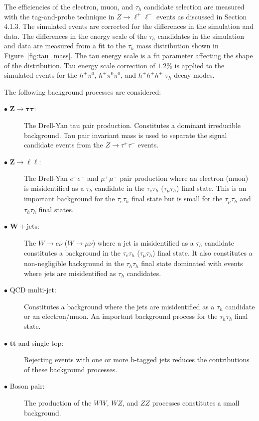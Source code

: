 The efficiencies of the electron, muon, and $\tau_h$ candidate selection are measured with the tag-and-probe technique in $Z\rightarrow \ell^{+}\ell^{-}$ events as discussed in Section 4.1.3. The simulated events are corrected for the differences in the simulation and data. The differences in the energy scale of the $\tau_h$ candidates in the simulation and data are measured from a fit to the $\tau_h$ mass distribution shown in Figure~\ref{fig:tau_mass}. The tau energy scale is a fit parameter affecting the shape of the distribution. Tau energy scale correction of $1.2\%$ is applied to the simulated events for the $h^{\pm}\pi^{0}$,  $h^{\pm}\pi^{0}\pi^{0}$, and $h^{\pm}h^{\mp}h^{\pm}$ $\tau_{h}$ decay modes. 

The following background processes are considered:
\begin{description}
\item[$\bullet$ $\boldsymbol{Z\rightarrow\tau\tau}$:] The Drell-Yan tau pair production. Constitutes a dominant irreducible background. Tau pair invariant mass is used to separate the signal candidate events from the  $Z\rightarrow\tau^{+}\tau^{-}$ events.
\item[$\bullet$ $\boldsymbol{Z\rightarrow\ell\ell}$:] The Drell-Yan $e^+e^-$ and $\mu^+\mu^-$ pair production where an electron (muon) is misidentified as a $\tau_h$ candidate in the $\tau_{e}\tau_h$ ($\tau_{\mu}\tau_h$) final state. This is an important background for the $\tau_{e}\tau_h$ final state but is small for the $\tau_{\mu}\tau_h$ and $\tau_{h}\tau_h$ final states.  
\item[$\bullet$ $\boldsymbol{W+}$jets:] The $W\rightarrow e\nu$ ($W\rightarrow \mu\nu$) where a jet is misidentified as a $\tau_h$ candidate constitutes a background in the $\tau_{e}\tau_h$ ($\tau_{\mu}\tau_h$) final state. It also constitutes a non-negligible background in the $\tau_{h}\tau_h$ final state dominated with events where jets are misidentified as  $\tau_h$ candidates. 
\item[$\bullet$ QCD multi-jet:] Constitutes a background where the jets are misidentified as a $\tau_h$ candidate or an electron/muon. An important background process for the $\tau_h\tau_h$ final state. 
\item[$\bullet$ $\boldsymbol{t\bar{t}}$ and single top:] Rejecting events with one or more  b-tagged jets reduces the contributions of these background processes.
\item[$\bullet$ Boson pair:] The production of the $WW$, $WZ$, and $ZZ$ processes constitutes a small background.
\end{description}    

